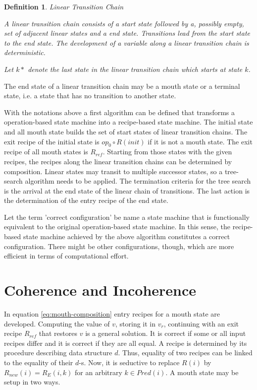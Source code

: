 \documentclass[12pt,a4paper]{scrartcl}
\newtheorem{definition}{Definition}
\begin{document}
\begin{definition} Linear Transition Chain

    A linear transition chain consists of a start state followed by a, possibly
    empty, set of adjacent linear states and a end state. Transitions lead
    from the start state to the end state.  The development of a variable
    along a linear transition chain is deterministic.

    Let $k*$ denote the last state in the linear transition chain which starts
    at state $k$.
    
\end{definition}

The end state of a linear transition chain may be a mouth state or a terminal
state, i.e. a state that has no transition to another state. 

With the notations above a first algorithm can be defined that transforms a
operation-based state machine into a recipe-based state machine. The initial
state and all mouth state builds the set of start states of linear transition
chains. The exit recipe of the initial state is $op_0\circ R(init)$ if it is
not a mouth state. The exit recipe of all mouth states is $R_{ref}$. Starting from
those states with the given recipes, the recipes along the linear transition
chains can be determined by composition. Linear states may transit to multiple
successor states, so a tree-search algorithm needs to be applied.  The
termination criteria for the tree search is the arrival at the end state of the
linear chain of transitions.  The last action is the determination of the entry
recipe of the end state. 

Let the term 'correct configuration' be name a state machine that is
functionally equivalent to the original operation-based state machine. In this
sense, the recipe-based state machine achieved by the above algorithm
constitutes a correct configuration.  There might be other configurations,
though, which are more efficient in terms of computational effort.

\section{Coherence and Incoherence}

In equation \eqref{eq:mouth-composition} entry recipes for a mouth state are
developed. Computing the value of $v$, storing it in $v_r$, continuing with an
exit recipe $R_{ref}$ that restores $v$ is a general solution. It is correct if
some or all input recipes differ and it is correct if they are all equal.  A
recipe is determined by its procedure describing data structure $d$. Thus,
equality of two recipes can be linked to the equality of their $d$-s. Now, it
is seductive to replace $R(i)$ by $R_{new}(i)=R_E(i,k)$ for an arbitrary $k\in
Pred(i)$.  A mouth state may be setup in two ways.
\end{document}
